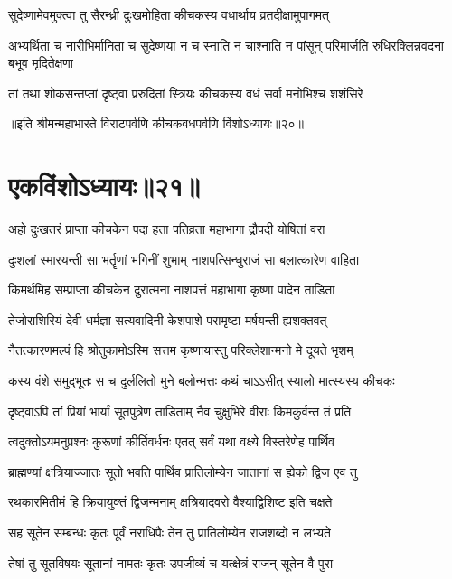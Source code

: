 
\twolineshloka
{सुदेष्णामेवमुक्त्वा तु सैरन्ध्री दुःखमोहिता}
{कीचकस्य वधार्थाय व्रतदीक्षामुपागमत्}


\threelineshloka
{अभ्यर्थिता च नारीभिर्मानिता च सुदेष्णया}
{न च स्नाति न चाश्नाति न पांसून् परिमार्जति}
{रुधिरक्लिन्नवदना बभूव मृदितेक्षणा}


\twolineshloka
{तां तथा शोकसन्तप्तां दृष्ट्वा प्ररुदितां स्त्रियः}
{कीचकस्य वधं सर्वा मनोभिश्च शशंसिरे}

॥इति श्रीमन्महाभारते विराटपर्वणि कीचकवधपर्वणि विंशोऽध्यायः॥२०॥

\chapter{एकविंशोऽध्यायः॥२१॥}

\twolineshloka
{अहो दुःखतरं प्राप्ता कीचकेन पदा हता}
{पतिव्रता महाभागा द्रौपदी योषितां वरा}


\twolineshloka
{दुःशलां स्मारयन्ती सा भर्तॄणां भगिनीं शुभाम्}
{नाशपत्सिन्धुराजं सा बलात्कारेण वाहिता}


\twolineshloka
{किमर्थमिह सम्प्राप्ता कीचकेन दुरात्मना}
{नाशपत्तं महाभागा कृष्णा पादेन ताडिता}


\twolineshloka
{तेजोराशिरियं देवी धर्मज्ञा सत्यवादिनी}
{केशपाशे परामृष्टा मर्षयन्ती ह्यशक्तवत्}


\twolineshloka
{नैतत्कारणमल्पं हि श्रोतुकामोऽस्मि सत्तम}
{कृष्णायास्तु परिक्लेशान्मनो मे दूयते भृशम्}


\twolineshloka
{कस्य वंशे समुद्भूतः स च दुर्ललितो मुने}
{बलोन्मत्तः कथं चाऽऽसीत् स्यालो मात्स्यस्य कीचकः}


\twolineshloka
{दृष्ट्वाऽपि तां प्रियां भार्यां सूतपुत्रेण ताडिताम्}
{नैव चुक्षुभिरे वीराः किमकुर्वन्त तं प्रति}



\twolineshloka
{त्वदुक्तोऽयमनुप्रश्नः कुरूणां कीर्तिवर्धनः}
{एतत् सर्वं यथा वक्ष्ये विस्तरेणेह पार्थिव}


\twolineshloka
{ब्राह्मण्यां क्षत्रियाज्जातः सूतो भवति पार्थिव}
{प्रातिलोम्येन जातानां स ह्येको द्विज एव तु}


\twolineshloka
{रथकारमितीमं हि क्रियायुक्तं द्विजन्मनाम्}
{क्षत्रियादवरो वैश्याद्विशिष्ट इति चक्षते}


\twolineshloka
{सह सूतेन सम्बन्धः कृतः पूर्वं नराधिपैः}
{तेन तु प्रातिलोम्येन राजशब्दो न लभ्यते}


\twolineshloka
{तेषां तु सूतविषयः सूतानां नामतः कृतः}
{उपजीव्यं च यत्क्षेत्रं राजन् सूतेन वै पुरा}


